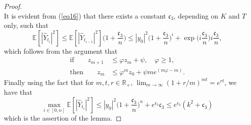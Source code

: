 \begin{proof}
\begin{equation*}
\end{equation*}
It is evident from (\ref{eq16}) that there exists a constant $\mathfrak{c}_3$, depending on $K$ and $T$ only, such that 
\begin{equation*}
    \mathbb{E}[|\hat{Y}_{t_i}|^2] \leq \mathbb{E}[|\hat{Y}_{t_{i-1}}|^2] \bigg( 1 + \frac{\mathfrak{c}_3}{n} \bigg) \leq |y_0|^2 \bigg( 1 + \frac{\mathfrak{c}_3}{n} \bigg)^i +  \exp{ \bigg(i \frac{\mathfrak{c}_3}{n} \bigg)} i \frac{\mathfrak{c}_3}{n},
\end{equation*}
which follows from the argument that
\begin{equation}\label{rec_arg}
    \begin{split}
        \text{if} \qquad z_{m+1} &\leq  \varphi z_{m} + \psi, \quad \varphi \geq 1,\\
        \text{then} \qquad z_{m} &\leq  \varphi^m z_{0} + \psi m e^{(m \varphi -m)}.
    \end{split} 
\end{equation}
Finally using the fact that for $m, t, r \in \mathbb{R}_+$, $\lim_{m \to \infty}(1 + r/m)^{mt} = e^{rt} $, we have that
\begin{equation*}
\max_{i \in [0, n]} \mathbb{E}[|\hat{Y}_{t_i}|^2] \leq |y_0|^2 \bigg( 1 + \frac{\mathfrak{c}_3}{n} \bigg)^n +  e^{\mathfrak{c}_3}\mathfrak{c}_3 \leq e^{\mathfrak{c}_3}(k^2 + \mathfrak{c}_3)
\end{equation*}
which is the assertion of the lemma.
\end{proof}

